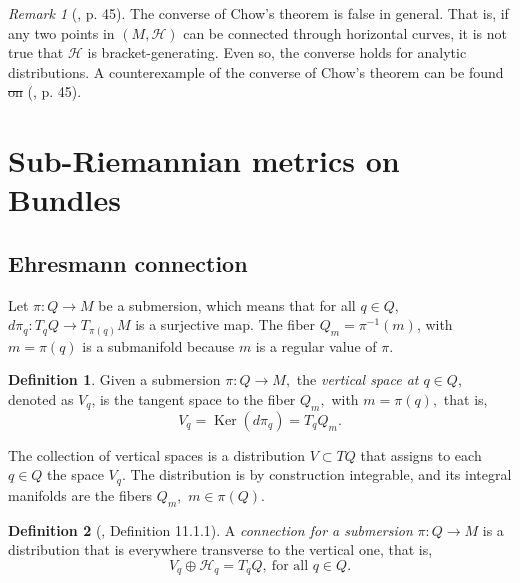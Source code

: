 \documentclass[12pt, letterpaper, reqno]{amsart}
\theoremstyle{definition}
\newtheorem{df}{Definition}
\theoremstyle{plain}
\theoremstyle{remark}
\newtheorem{rem}{Remark}
\providecommand{\DIFadd}[1]{{\protect\color{blue}\uwave{#1}}} %
\providecommand{\DIFdel}[1]{{\protect\color{red}\sout{#1}}}                      %
\providecommand{\DIFaddbegin}{} %
\providecommand{\DIFaddend}{} %
\providecommand{\DIFdelbegin}{} %
\providecommand{\DIFdelend}{} %
\newcommand{\DIFscaledelfig}{0.5}
\newlength{\DIFdelgraphicswidth} %
\newlength{\DIFdelgraphicsheight} %
\newcommand{\DIFaddincludegraphics}[2][]{{\color{blue}\fbox{\DIFOincludegraphics[#1]{#2}}}} %
\newcommand{\DIFdelincludegraphics}[2][]{%
\sbox{\DIFdelgraphicsbox}{\DIFOincludegraphics[#1]{#2}}%
\settoboxwidth{\DIFdelgraphicswidth}{\DIFdelgraphicsbox} %
\settoboxtotalheight{\DIFdelgraphicsheight}{\DIFdelgraphicsbox} %
\scalebox{\DIFscaledelfig}{%
\parbox[b]{\DIFdelgraphicswidth}{\usebox{\DIFdelgraphicsbox}\\[-\baselineskip] \rule{\DIFdelgraphicswidth}{0em}}\llap{\resizebox{\DIFdelgraphicswidth}{\DIFdelgraphicsheight}{%
\setlength{\unitlength}{\DIFdelgraphicswidth}%
\begin{picture}(1,1)%
\thicklines\linethickness{2pt} %
{\color[rgb]{1,0,0}\put(0,0){\framebox(1,1){}}}%
{\color[rgb]{1,0,0}\put(0,0){\line( 1,1){1}}}%
{\color[rgb]{1,0,0}\put(0,1){\line(1,-1){1}}}%
\end{picture}%
}\hspace*{3pt}}} %
} %
\DeclareRobustCommand{\DIFaddbegin}{\DIFOaddbegin \let\includegraphics\DIFaddincludegraphics} %
\DeclareRobustCommand{\DIFaddend}{\DIFOaddend \let\includegraphics\DIFOincludegraphics} %
\DeclareRobustCommand{\DIFdelbegin}{\DIFOdelbegin \let\includegraphics\DIFdelincludegraphics} %
\DeclareRobustCommand{\DIFdelend}{\DIFOaddend \let\includegraphics\DIFOincludegraphics} %
\begin{document}
\begin{rem}[\cite{montgomery2002tour}, p. 45]
	The converse of Chow's theorem is false in general. That is, if any two points in $ (M,\mathcal{H}) $ can be connected through horizontal curves, it is not true that $ \mathcal{H} $ is bracket-generating. Even so, the converse holds for analytic distributions. A counterexample of  the converse of Chow's theorem can be found \DIFdelbegin \DIFdel{on }\DIFdelend \DIFaddbegin \DIFadd{in }\DIFaddend (\cite{montgomery2002tour}, p. 45).
\end{rem}
\section{Sub-Riemannian metrics on Bundles}%
\label{sec:metrics_on_bundles}
\subsection{Ehresmann connection}%
\label{sub:ehresmann_connection}


Let $ \pi : Q \rightarrow {M} $ be a submersion, which means that for all $ q\in Q $, $ d\pi_q : T_q Q \rightarrow {T_{\pi(q)}}M $ is a surjective map. The fiber $ Q_m = \pi^{-1}(m) $, with $ m=\pi(q) $ is a submanifold because $ m $ is a regular value of $ \pi. $  

\begin{df}
	Given a submersion $ \pi:Q \rightarrow {M}, $ the \textit{vertical space at $ q\in Q $}, denoted as $ V_q $, is the tangent space to the fiber $ Q_m, $ with $ m=\pi(q), $ that is,  
	$$ V_q = \operatorname{Ker}(d\pi_q) = T_q Q_m.  $$ 
\end{df}

The collection of vertical spaces is a distribution $ V \subset TQ $ that assigns to each $ q\in Q $ the space $ V_q. $ The distribution is by construction integrable, and its integral manifolds are the fibers $ Q_m, $ $ m\in \pi(Q). $ 

\DIFdelbegin %
\DIFdelend \DIFaddbegin \begin{df}[\cite{montgomery2002tour}, Definition 11.1.1]
	\DIFaddend A \textit{connection for a submersion} $ \pi:Q \rightarrow {M} $ is a distribution that is everywhere transverse to the vertical one, that is,  
	$$ V_q \oplus \mathcal{H}_q = T_q Q,\ \text{for all } q\in Q. $$ 
\end{df}
\end{document}
